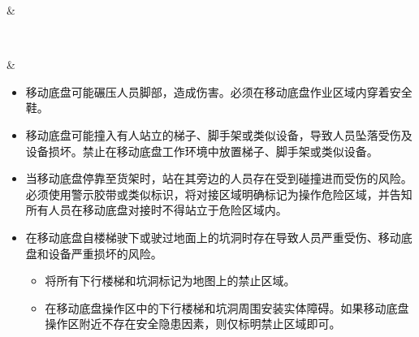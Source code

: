 \documentclass[a4paper,11pt,english,openany,oneside]{sphinxmanual}
\renewcommand{\sphinxstyletheadfamily}{
\color{white}\bfseries
}
\begin{document}
\begin{savenotes}\sphinxattablestart
\sphinxthistablewithglobalstyle
\centering
{}
\sphinxthecaptionisattop
{}\label{\detokenize{05 _u5b89_u5168_u89c4_u8303:id18}}
\sphinxaftertopcaption
\begin{tabular}[t]{}
\sphinxtoprule
\begin{varwidth}[t]{}
\sphinxstyletheadfamily \sphinxAtStartPar
{}
\sphinxbeforeendvarwidth
\end{varwidth}%
&\begin{varwidth}[t]{}
\sphinxstyletheadfamily \sphinxAtStartPar
{}
\sphinxbeforeendvarwidth
\end{varwidth}%
\\
\sphinxmidrule
\sphinxtableatstartofbodyhook\begin{varwidth}[t]{}

\noindent{}
\sphinxbeforeendvarwidth
\end{varwidth}%
&\begin{varwidth}[t]{}
\sphinxAtStartPar
{}
\begin{itemize}
\item {} 
\sphinxAtStartPar
移动底盘可能碾压人员脚部，造成伤害。必须在移动底盘作业区域内穿着安全鞋。

\item {} 
\sphinxAtStartPar
移动底盘可能撞入有人站立的梯子、脚手架或类似设备，导致人员坠落受伤及设备损坏。禁止在移动底盘工作环境中放置梯子、脚手架或类似设备。

\item {} 
\sphinxAtStartPar
当移动底盘停靠至货架时，站在其旁边的人员存在受到碰撞进而受伤的风险。必须使用警示胶带或类似标识，将对接区域明确标记为操作危险区域，并告知所有人员在移动底盘对接时不得站立于危险区域内。

\item {} 
\sphinxAtStartPar
在移动底盘自楼梯驶下或驶过地面上的坑洞时存在导致人员严重受伤、移动底盘和设备严重损坏的风险。
\begin{itemize}
\item {} 
\sphinxAtStartPar
将所有下行楼梯和坑洞标记为地图上的禁止区域。

\item {} 
\sphinxAtStartPar
在移动底盘操作区中的下行楼梯和坑洞周围安装实体障碍。如果移动底盘操作区附近不存在安全隐患因素，则仅标明禁止区域即可。


\end{itemize}
\end{itemize}
\end{varwidth}
\end{tabular}
\end{savenotes}
\end{document}
